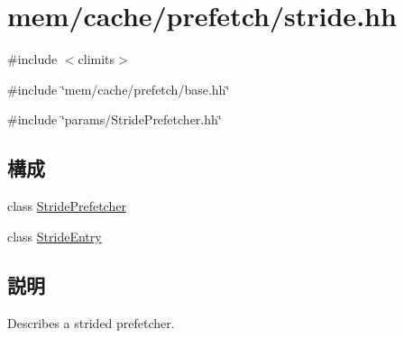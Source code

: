 \hypertarget{stride_8hh}{
\section{mem/cache/prefetch/stride.hh}
\label{stride_8hh}
}
{\ttfamily \#include $<$climits$>$}\par
{\ttfamily \#include \char`\"{}mem/cache/prefetch/base.hh\char`\"{}}\par
{\ttfamily \#include \char`\"{}params/StridePrefetcher.hh\char`\"{}}\par
\subsection*{構成}
\begin{DoxyCompactItemize}
\item 
class \hyperlink{classStridePrefetcher}{StridePrefetcher}
\item 
class \hyperlink{classStridePrefetcher_1_1StrideEntry}{StrideEntry}
\end{DoxyCompactItemize}


\subsection{説明}
Describes a strided prefetcher. 